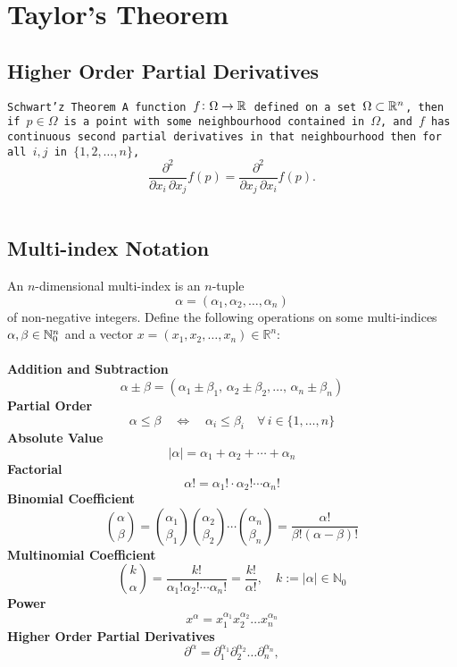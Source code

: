 \documentclass[11pt,a4paper]{article}
\begin{document}
\newpage

\section{Taylor's Theorem}
\subsection{Higher Order Partial Derivatives}
\begin{theorem}
  \tt{Schwart'z Theorem}
  A function $f \colon \Omega \to \mathbb{R}$ defined
  on a set $\Omega \subset \mathbb{R}^n$, then if $p \in \Omega$ is a point
  with some neighbourhood contained in $\Omega$, and $f$ has continuous
  second partial derivatives in that neighbourhood then for all $i,j$
  in $\{1,2,\dots,n\}$,
  \[
    {\frac {\partial ^{2}}{\partial x_{i}\,
    \partial x_{j}}}f({p})={\frac {\partial ^{2}}{\partial x_{j}\,
    \partial x_{i}}}f({p}).
  \]
\end{theorem}

\subsection{Multi-index Notation}
An $n$-dimensional multi-index is an $n$-tuple
\[
  \alpha = (\alpha_{1},\alpha_{2},\ldots,\alpha_{n})
\]
of non-negative integers. Define the following operations on some
multi-indices $\alpha ,\beta \in \mathbb{N}_{0}^{n}$ and a vector
$x=(x_{1},x_{2},\ldots ,x_{n})\in \mathbb {R} ^{n}$: \\
\phantom{} \\
\textbf{Addition and Subtraction}
\[
  \alpha \pm \beta =
  (\alpha _{1}\pm \beta _{1},\,\alpha _{2}\pm 
  \beta _{2},\ldots ,\,\alpha _{n}\pm \beta _{n})
\]
\textbf{Partial Order}
\[
  \alpha \leq \beta \quad \Leftrightarrow \quad 
  \alpha _{i}\leq \beta _{i}\quad \forall \,i\in \{1,\ldots ,n\}
\]
\textbf{Absolute Value}
\[
  |\alpha |=\alpha _{1}+\alpha _{2}+\cdots +\alpha _{n}
\]
\textbf{Factorial}
\[
  \alpha !=\alpha _{1}!\cdot \alpha _{2}!\cdots \alpha _{n}!
\]
\textbf{Binomial Coefficient}
\[
  {\binom {\alpha}{\beta}} = 
  {\binom {\alpha_{1}}{\beta_{1}}}
  {\binom {\alpha_{2}}{\beta_{2}}}\cdots 
  {\binom {\alpha_{n}}{\beta_{n}}} = 
  {\frac {\alpha!}{\beta! (\alpha-\beta)!}}
\]
\textbf{Multinomial Coefficient}
\[
  {\binom {k}{\alpha}} = 
  {\frac {k!}{\alpha_{1}!\alpha_{2}! \cdots \alpha_{n}!}} = 
  {\frac {k!}{\alpha!}}, 
  \quad k:=|\alpha |\in \mathbb {N}_{0}
\]
\textbf{Power}
\[
  x^{\alpha} = 
  x_{1}^{\alpha_{1}}x_{2}^{\alpha_{2}}\ldots x_{n}^{\alpha_{n}}
\]
\textbf{Higher Order Partial Derivatives}
\[
  \partial^{\alpha} = 
  \partial_{1}^{\alpha _{1}}
  \partial _{2}^{\alpha _{2}} \ldots 
  \partial _{n}^{\alpha _{n}},
\]
\end{document}
